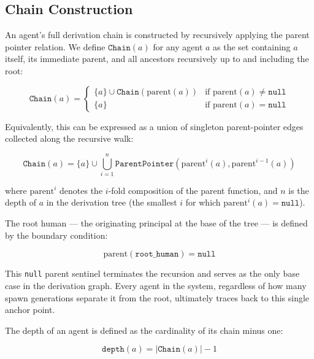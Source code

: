 \subsection{Chain Construction}

An agent's full derivation chain is constructed by recursively applying the
parent pointer relation. We define $\texttt{Chain}(a)$ for any agent $a$ as
the set containing $a$ itself, its immediate parent, and all ancestors
recursively up to and including the root:

\begin{equation}
  \texttt{Chain}(a) = 
  \begin{cases}
    \{a\} \cup \texttt{Chain}(\text{parent}(a)) & \text{if } \text{parent}(a) \neq \texttt{null} \\
    \{a\} & \text{if } \text{parent}(a) = \texttt{null}
  \end{cases}
\end{equation}

Equivalently, this can be expressed as a union of singleton parent-pointer
edges collected along the recursive walk:

\begin{equation}
  \texttt{Chain}(a) = \{a\} \cup \bigcup_{i=1}^{n}
  \texttt{ParentPointer}(\text{parent}^i(a), \text{parent}^{i-1}(a))
\end{equation}

where $\text{parent}^i$ denotes the $i$-fold composition of the parent
function, and $n$ is the depth of $a$ in the derivation tree (the smallest
$i$ for which $\text{parent}^i(a) = \texttt{null}$).

The root human --- the originating principal at the base of the tree ---
is defined by the boundary condition:

\begin{equation}
  \text{parent}(\texttt{root\_human}) = \texttt{null}
\end{equation}

This \texttt{null} parent sentinel terminates the recursion and serves as the
only base case in the derivation graph. Every agent in the system, regardless
of how many spawn generations separate it from the root, ultimately traces
back to this single anchor point.

The depth of an agent is defined as the cardinality of its chain minus one:

\begin{equation}
  \texttt{depth}(a) = |\texttt{Chain}(a)| - 1
\end{equation}

